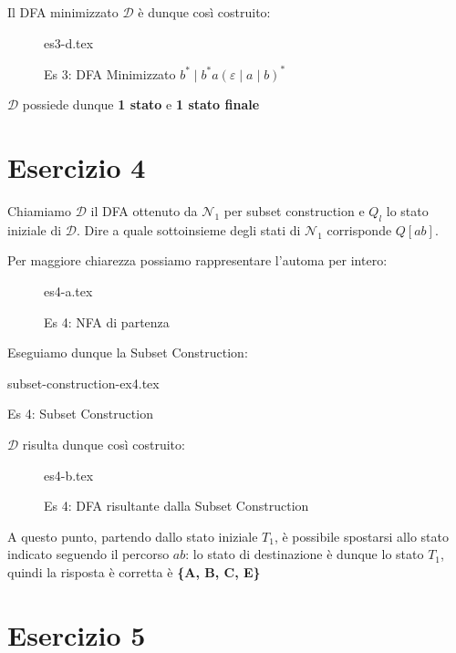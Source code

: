 \documentclass[class=book, crop=false, oneside, 12pt]{standalone}
\begin{document}
Il DFA minimizzato \(\mathcal{D}\) è dunque così costruito:

\begin{figure}[H]
	\centering
    {es3-d.tex}
    \caption{Es 3: DFA Minimizzato \(b^* \mid b^* a (\varepsilon \mid a \mid b)^*\)}
    \label{fig:dfa-minimized-ex3}
\end{figure}

\(\mathcal{D}\) possiede dunque \textbf{1 stato} e \textbf{1 stato finale}

\section*{Esercizio 4}

Chiamiamo \(\mathcal{D}\) il DFA ottenuto da \(\mathcal{N}_1\) per subset construction e \(Q_l\) lo stato iniziale di \(\mathcal{D}\).  Dire a quale sottoinsieme degli stati di \(\mathcal{N}_1\) corrisponde \(Q[ab]\).

Per maggiore chiarezza possiamo rappresentare l'automa per intero:

\begin{figure}[H]
	\centering
    {es4-a.tex}
    \caption{Es 4: NFA di partenza}
    \label{fig:nfa-ex4}
\end{figure}

Eseguiamo dunque la Subset Construction:

\begin{table}[H]
    \centering
    {subset-construction-ex4.tex}
    \caption{Es 4: Subset Construction}
    \label{tab:subset-construction-ex4}
\end{table}

\(\mathcal{D}\) risulta dunque così costruito:

\begin{figure}[H]
	\centering
    {es4-b.tex}
    \caption{Es 4: DFA risultante dalla Subset Construction}
    \label{fig:sc-ex4}
\end{figure}

A questo punto, partendo dallo stato iniziale \(T_1\), è possibile spostarsi allo stato indicato seguendo il percorso \(ab\): lo stato di destinazione è dunque lo stato \(T_1\), quindi la risposta è corretta è \textbf{\{A, B, C, E\}}

\section*{Esercizio 5}
\end{document}
